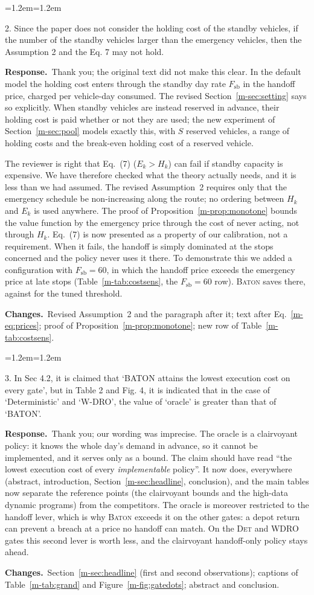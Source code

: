 \documentclass[11pt]{article}
\newenvironment{comment}{\par\medskip\noindent\color{rev}\itshape
  \begin{list}{}{\leftmargin=1.2em\rightmargin=1.2em}\item[]}%
  {\end{list}\par}
\newcommand{\resp}{\par\noindent\textbf{Response.}\ }
\newcommand{\chg}{\par\noindent\textbf{Changes.}\ }
\newcommand{\sref}[1]{Section~\ref{m-#1}}
\newcommand{\tref}[1]{Table~\ref{m-#1}}
\newcommand{\fref}[1]{Figure~\ref{m-#1}}
\newcommand{\BATON}{\textsc{Baton}}
\begin{document}
\begin{comment}
2. Since the paper does not consider the holding cost of the standby
vehicles, if the number of the standby vehicles larger than the
emergency vehicles, then the Assumption 2 and the Eq. 7 may not hold.
\end{comment}
\resp Thank you; the original text did not make this clear. In the
default model the holding cost enters through the standby day rate
$F_{\mathrm{sb}}$ in the handoff price, charged per vehicle-day
consumed. The revised
\sref{sec:setting} says so explicitly. When standby vehicles are
instead reserved in advance, their holding cost is paid whether or not
they are used; the new experiment of \sref{sec:pool} models exactly
this, with $S$ reserved vehicles, a range of holding costs and the
break-even holding cost of a reserved vehicle.

The reviewer is right that Eq.~(7) ($E_k > H_k$) can fail if standby
capacity is expensive. We have therefore checked what the theory
actually needs, and it is less than we had assumed. The revised
Assumption~2 requires only that the emergency schedule be
non-increasing along the route; no ordering between $H_k$ and $E_k$ is
used anywhere. The proof of Proposition~\ref{m-prop:monotone} bounds
the value function by the emergency price through the cost of never
acting, not through $H_k$. Eq.~(7) is now presented as a property of
our calibration, not a requirement. When it fails, the handoff is simply
dominated at the stops concerned and the policy never uses it there.
To demonstrate this we added a configuration with $F_{\mathrm{sb}} = 60$,
in which the handoff price exceeds the emergency price at late stops
(\tref{tab:costsens}, the $F_{\mathrm{sb}} = 60$ row). \BATON{} saves \sbSixtyBaton{} there,
against \sbSixtyThresh{} for the tuned threshold.
\chg Revised Assumption~2 and the paragraph after it; text after
Eq.~\eqref{m-eq:prices}; proof of Proposition~\ref{m-prop:monotone};
new row of \tref{tab:costsens}.

\begin{comment}
3. In Sec 4.2, it is claimed that `BATON attains the lowest execution
cost on every gate', but in Table 2 and Fig. 4, it is indicated that in
the case of `Deterministic' and `W-DRO', the value of `oracle' is
greater than that of `BATON'.
\end{comment}
\resp Thank you; our wording was imprecise. The oracle is a clairvoyant
policy: it knows the whole day's demand in advance, so it cannot be
implemented, and it serves only as a bound. The claim should have read
``the lowest execution cost of every \emph{implementable} policy''. It
now does, everywhere (abstract, introduction, \sref{sec:headline},
conclusion), and the main tables now separate the reference points (the
clairvoyant bounds and the high-data dynamic programs) from the
competitors. The
oracle is moreover restricted to the handoff lever, which is why
\BATON{} exceeds it on the other gates: a depot return can prevent a
breach at a price no handoff can match. On the \textsc{Det} and
\textsc{WDRO} gates this second lever is worth less, and the
clairvoyant handoff-only policy stays ahead.
\chg \sref{sec:headline} (first and second observations); captions of
\tref{tab:grand} and \fref{fig:gatedots}; abstract and conclusion.
\end{document}
